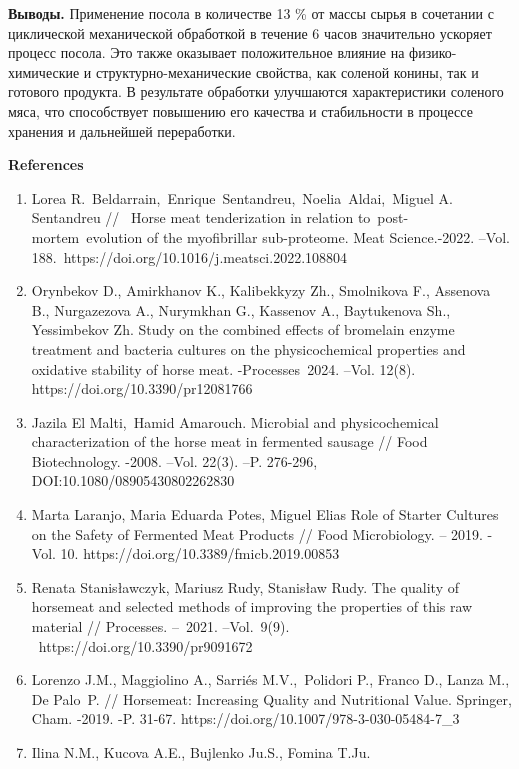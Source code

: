 {\bfseries Выводы.} Применение посола в количестве 13 \% от массы сырья в
сочетании с циклической механической обработкой в течение 6 часов
значительно ускоряет процесс посола. Это также оказывает положительное
влияние на физико-химические и структурно-механические свойства, как
соленой конины, так и готового продукта. В результате обработки
улучшаются характеристики соленого мяса, что способствует повышению его
качества и стабильности в процессе хранения и дальнейшей переработки.

{\bfseries References}

\begin{enumerate}
\def\labelenumi{\arabic{enumi}.}
\item
  Lorea R.~Beldarrain,~Enrique~Sentandreu,~Noelia~Aldai,~Miguel A.
  Sentandreu //~ Horse meat tenderization in relation
  to~post-mortem~evolution of the myofibrillar sub-proteome. Meat
  Science.-2022. --Vol.
  188.~https://doi.org/10.1016/j.meatsci.2022.108804
\item
  Orynbekov D., Amirkhanov K., Kalibekkyzy Zh., Smolnikova F., Assenova
  B., Nurgazezova A., Nurymkhan G., Kassenov A., Baytukenova Sh.,
  Yessimbekov Zh. Study on the combined effects of bromelain enzyme
  treatment and bacteria cultures on the physicochemical properties and
  oxidative stability of horse meat. -Processes\emph{~}2024. --Vol.
  12(8). https://doi.org/10.3390/pr12081766
\item
  Jazila El Malti,~Hamid Amarouch. Microbial and physicochemical
  characterization of the horse meat in fermented sausage // Food
  Biotechnology. -2008. --Vol. 22(3). --P. 276-296,
  DOI:10.1080/08905430802262830
\item
  Marta Laranjo, Maria Eduarda Potes, Miguel Elias Role of Starter
  Cultures on the Safety of Fermented Meat Products // Food
  Microbiology. -- 2019. -Vol. 10.
  https://doi.org/10.3389/fmicb.2019.00853
\item
  Renata Stanisławczyk, Mariusz Rudy, Stanisław Rudy. The quality of
  horsemeat and selected methods of improving the properties of this raw
  material // Processes. --~2021. --Vol.~9(9).
  ~https://doi.org/10.3390/pr9091672
\item
  Lorenzo J.M., Maggiolino A., Sarriés M.V.,~Polidori P., Franco D.,
  Lanza M., De Palo~P. // Horsemeat: Increasing Quality and Nutritional
  Value. Springer, Cham. -2019. -P. 31-67.
  https://doi.org/10.1007/978-3-030-05484-7\_3
\item
  Il\textquotesingle ina N.M., Kucova A.E., Bujlenko Ju.S., Fomina T.Ju.

\end{enumerate}
